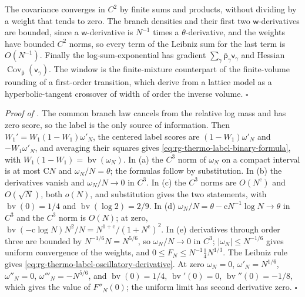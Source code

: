 The covariance converges in $C^2$ by finite sums and products, without dividing by a weight that
tends to zero. The branch densities and their first two $\mathsf w$-derivatives are bounded, since a
$\mathsf w$-derivative is $N^{-1}$ times a $\theta$-derivative, and the weights have bounded $C^2$
norms, so every term of the Leibniz sum for the last term is $O(N^{-1})$. Finally the
log-sum-exponential has gradient $\sum_\gamma\bar{\mathsf p}_\gamma\mathsf v_\gamma$ and Hessian
$\operatorname{Cov}_{\bar{\mathsf p}}(\mathsf v_\gamma)$. The window is the finite-mixture
counterpart of the finite-volume rounding of a first-order transition, which
\citet{BorgsKotecky1990} derive from a lattice model as a hyperbolic-tangent crossover of width of
order the inverse volume. $\square$

\noindent\emph{Proof of .}
The common branch law cancels from the relative log mass and has zero score, so the label is the
only source of information. Then $W_1'=W_1(1-W_1)\omega'_N$, the centered label scores are
$(1-W_1)\omega'_N$ and $-W_1\omega'_N$, and averaging their squares gives
\eqref{eq:rg-thermo-label-binary-formula}, with $W_1(1-W_1)=\operatorname{bv}(\omega_N)$. In (a) the
$C^3$ norm of $\omega_N$ on a compact interval is at most $\mathrm CN$ and $\omega_N/N=\theta$; the
formulas follow by substitution. In (b) the derivatives vanish and $\omega_N/N\to0$ in $C^3$. In (c)
the $C^3$ norms are $O(N^{\mathrm c})$ and $O(\sqrt N)$, both $o(N)$, and substitution gives the two
statements, with $\operatorname{bv}(0)=1/4$ and $\operatorname{bv}(\log2)=2/9$. In (d)
$\omega_N/N=\theta-\mathrm cN^{-1}\log N\to\theta$ in $C^3$ and the $C^3$ norm is $O(N)$; at zero,
$\operatorname{bv}(-\mathrm c\log N)N^2/N=N^{1+\mathrm c}/(1+N^{\mathrm c})^2$. In (e) derivatives
through order three are bounded by $N^{-1/6}N=N^{5/6}$, so $\omega_N/N\to0$ in $C^3$;
$\lvert\omega_N\rvert\leq N^{-1/6}$ gives uniform convergence of the weights, and
$0\leq F_N\leq N^{-1}\tfrac14N^{1/3}$. The Leibniz rule gives
\eqref{eq:rg-thermo-label-oscillatory-derivative}. At zero $\omega_N=0$, $\omega'_N=N^{1/6}$,
$\omega''_N=0$, $\omega'''_N=-N^{5/6}$, and $\operatorname{bv}(0)=1/4$, $\operatorname{bv}'(0)=0$,
$\operatorname{bv}''(0)=-1/8$, which gives the value of $F''_N(0)$; the uniform limit has second
derivative zero. $\square$

